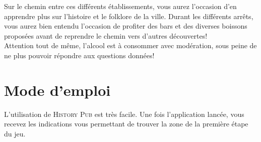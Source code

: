 \documentclass[11pt]{scrreprt}
\begin{document}
    Sur le chemin entre ces différents établissements, vous aurez l'occasion d'en apprendre plus sur l'histoire et le folklore de la ville. Durant les différents arrêts, vous aurez bien entendu l'occasion de profiter des bars et des diverses boissons proposées avant de reprendre le chemin vers d'autres découvertes!\\

    Attention tout de même, l'alcool est à consommer avec modération, sous peine de ne plus pouvoir répondre aux questions données!\\

    \chapter{Mode d'emploi}
    L'utilisation de \textsc{History Pub} est très facile. Une fois l'application lancée, vous recevez les indications vous permettant de trouver la zone de la première étape du jeu.
\end{document}
